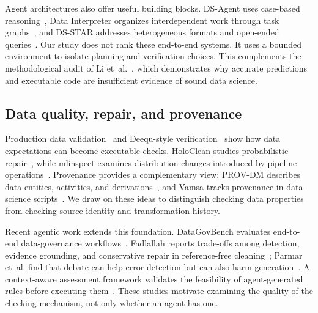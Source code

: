 \documentclass[conference]{IEEEtran}
\begin{document}
Agent architectures also offer useful building blocks. DS-Agent uses case-based reasoning~\cite{guo2024dsagent}, Data Interpreter organizes interdependent work through task graphs~\cite{hong2024datainterpreter}, and DS-STAR addresses heterogeneous formats and open-ended queries~\cite{nam2025dsstar}. Our study does not rank these end-to-end systems. It uses a bounded environment to isolate planning and verification choices. This complements the methodological audit of Li et~al.~\cite{li2026silent}, which demonstrates why accurate predictions and executable code are insufficient evidence of sound data science.

\subsection{Data quality, repair, and provenance}
Production data validation~\cite{polyzotis2019datavalidation} and Deequ-style verification~\cite{schelter2018deequ} show how data expectations can become executable checks. HoloClean studies probabilistic repair~\cite{rekatsinas2017holoclean}, while mlinspect examines distribution changes introduced by pipeline operations~\cite{grafberger2021mlinspect}. Provenance provides a complementary view: PROV-DM describes data entities, activities, and derivations~\cite{w3c2013provdm}, and Vamsa tracks provenance in data-science scripts~\cite{namaki2020vamsa}. We draw on these ideas to distinguish checking data properties from checking source identity and transformation history.

Recent agentic work extends this foundation. DataGovBench evaluates end-to-end data-governance workflows~\cite{liu2025datagovbench}. Fadlallah reports trade-offs among detection, evidence grounding, and conservative repair in reference-free cleaning~\cite{fadlallah2026cleaning}; Parmar et~al. find that debate can help error detection but can also harm generation~\cite{parmar2026debate}. A context-aware assessment framework validates the feasibility of agent-generated rules before executing them~\cite{fadlallah2026dqa}. These studies motivate examining the quality of the checking mechanism, not only whether an agent has one.
\end{document}
